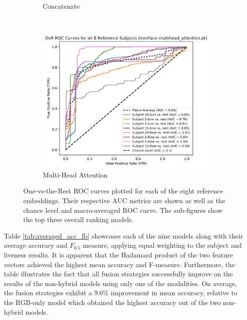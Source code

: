 \documentclass{mpaper}
\begin{document}
\begin{figure}[ht!]
\begin{subfigure}[b]{0.315\textwidth}
        \caption{Concatenate}
        \label{fig:roc_concatenate}
    \end{subfigure}
    ~\hspace{0.001cm}
    \begin{subfigure}[b]{0.325\textwidth}
        \includegraphics[width=1.09\textwidth]{figures/roc_multihead_attention.png}
        \caption{Multi-Head Attention}
        \label{fig:roc_multihead_attention}
    \end{subfigure}
    \vspace{0.1cm}
    \caption{One-vs-the-Rest ROC curves plotted for each of the eight reference embeddings. Their respective AUC metrics are shown as well as the chance level and macro-averaged ROC curve. The sub-figures show the top three overall ranking models.}
    \vspace{-0.35cm}
\end{figure}

Table \ref{tab:averaged_acc_fb} showcases each of the nine models along with their average accuracy and $F_{0.5}$ measure, applying equal weighting to the subject and liveness results. It is apparent that the Hadamard product of the two feature vectors achieved the highest mean accuracy and F-measure. Furthermore, the table illustrates the fact that all fusion strategies successfully improve on the results of the non-hybrid models using only one of the modalities. On average, the fusion strategies exhibit a 9.6\% improvement in mean accuracy, relative to the RGB-only model which obtained the highest accuracy out of the two non-hybrid models.
\end{document}
